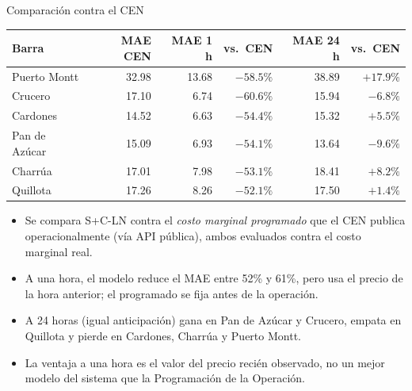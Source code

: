 \documentclass[aspectratio=169]{beamer}
\begin{document}
\begin{frame}{Comparación contra el CEN}
    \begin{table}
        \centering
        \tiny
        \begin{tabular}{lrrrrr}
            \toprule
            \textbf{Barra} & \textbf{MAE CEN} & \textbf{MAE 1 h} & \textbf{vs.\ CEN} & \textbf{MAE 24 h} & \textbf{vs.\ CEN} \\
            \midrule
            Puerto Montt  & 32.98 & 13.68 & $-58.5\%$ & 38.89 & $+17.9\%$ \\
            Crucero       & 17.10 & 6.74  & $-60.6\%$ & 15.94 & $-6.8\%$  \\
            Cardones      & 14.52 & 6.63  & $-54.4\%$ & 15.32 & $+5.5\%$  \\
            Pan de Azúcar & 15.09 & 6.93  & $-54.1\%$ & 13.64 & $-9.6\%$  \\
            Charrúa       & 17.01 & 7.98  & $-53.1\%$ & 18.41 & $+8.2\%$  \\
            Quillota      & 17.26 & 8.26  & $-52.1\%$ & 17.50 & $+1.4\%$  \\
            \bottomrule
        \end{tabular}
    \end{table}
    \vspace{0.3em}
    \begin{itemize}
        \item Se compara S+C-LN contra el \textit{costo marginal programado} que el CEN publica operacionalmente (vía API pública), ambos evaluados contra el costo marginal real.
        \item A una hora, el modelo reduce el MAE entre 52\% y 61\%, pero usa el precio de la hora anterior; el programado se fija antes de la operación.
        \item A 24 horas (igual anticipación) gana en Pan de Azúcar y Crucero, empata en Quillota y pierde en Cardones, Charrúa y Puerto Montt.
        \item La ventaja a una hora es el valor del precio recién observado, no un mejor modelo del sistema que la Programación de la Operación.
    \end{itemize}
\end{frame}
\end{document}
